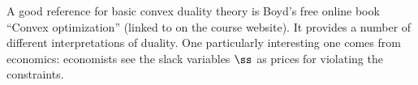 A good reference for basic convex duality theory is Boyd's free online book ``Convex
optimization'' (linked to on the course website).
It provides a number of different interpretations of duality. One
particularly interesting one comes from economics:
economists see the slack variables $\ss$ as prices for violating the constraints.

%



